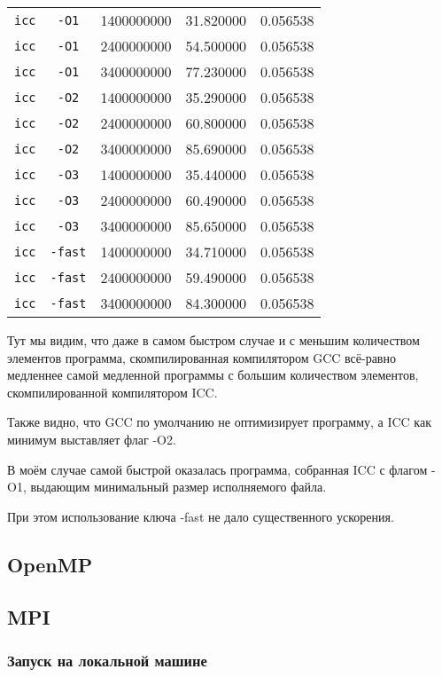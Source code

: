 \documentclass[a4paper,12pt]{article}
\begin{document}
\begin{tabular}{c | c | c c c}
\hline
\texttt{icc} & \texttt{-O1} & 1400000000 & 31.820000 & 0.056538\\
\texttt{icc} & \texttt{-O1} & 2400000000 & 54.500000 & 0.056538\\
\texttt{icc} & \texttt{-O1} & 3400000000 & 77.230000 & 0.056538\\
\hline
\texttt{icc} & \texttt{-O2} & 1400000000 & 35.290000 & 0.056538\\
\texttt{icc} & \texttt{-O2} & 2400000000 & 60.800000 & 0.056538\\
\texttt{icc} & \texttt{-O2} & 3400000000 & 85.690000 & 0.056538\\
\hline
\texttt{icc} & \texttt{-O3} & 1400000000 & 35.440000 & 0.056538\\
\texttt{icc} & \texttt{-O3} & 2400000000 & 60.490000 & 0.056538\\
\texttt{icc} & \texttt{-O3} & 3400000000 & 85.650000 & 0.056538\\
\hline
\texttt{icc} & \texttt{-fast} & 1400000000 & 34.710000 & 0.056538\\
\texttt{icc} & \texttt{-fast} & 2400000000 & 59.490000 & 0.056538\\
\texttt{icc} & \texttt{-fast} & 3400000000 & 84.300000 & 0.056538\\
\hline
\end{tabular}

Тут мы видим, что даже в самом быстром случае и с меньшим количеством элементов программа, скомпилированная компилятором GCC всё-равно медленнее самой медленной программы с большим количеством элементов, скомпилированной компилятором ICC.

Также видно, что GCC по умолчанию не оптимизирует программу, а ICC как минимум выставляет флаг -O2.

В моём случае самой быстрой оказалась программа, собранная ICC с флагом -O1, выдающим минимальный размер исполняемого файла.

При этом использование ключа -fast не дало существенного ускорения.
\newpage
\subsection{OpenMP}

\newpage
\subsection{MPI}
\subsubsection{Запуск на локальной машине}
\end{document}
